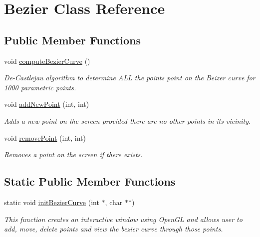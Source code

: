 \hypertarget{class_bezier}{}\section{Bezier Class Reference}
\label{class_bezier}
\subsection*{Public Member Functions}
\begin{DoxyCompactItemize}
\item 
\mbox{\label{class_bezier_a4be508a588a551dd7288485a8cddba8e}} 
void \mbox{\hyperlink{class_bezier_a4be508a588a551dd7288485a8cddba8e}{compute\+Bezier\+Curve}} ()
\begin{DoxyCompactList}\small\item\em De-\/\+Castlejau algorithm to determine A\+LL the points point on the Beizer curve for 1000 parametric points. \end{DoxyCompactList}\item 
void \mbox{\hyperlink{class_bezier_ae7c0e0872d17a91d515db6c60fdb0449}{add\+New\+Point}} (int, int)
\begin{DoxyCompactList}\small\item\em Adds a new point on the screen provided there are no other points in its vicinity. \end{DoxyCompactList}\item 
void \mbox{\hyperlink{class_bezier_a75b6151225690003365386cb63c42704}{remove\+Point}} (int, int)
\begin{DoxyCompactList}\small\item\em Removes a point on the screen if there exists. \end{DoxyCompactList}\end{DoxyCompactItemize}
\subsection*{Static Public Member Functions}
\begin{DoxyCompactItemize}
\item 
static void \mbox{\hyperlink{class_bezier_a3cdb8c9cf3ad2a4e48d7dfac8f98b71f}{init\+Bezier\+Curve}} (int $\ast$, char $\ast$$\ast$)
\begin{DoxyCompactList}\small\item\em This function creates an interactive window using Open\+GL and allows user to add, move, delete points and view the bezier curve through those points. \end{DoxyCompactList}\end{DoxyCompactItemize}



